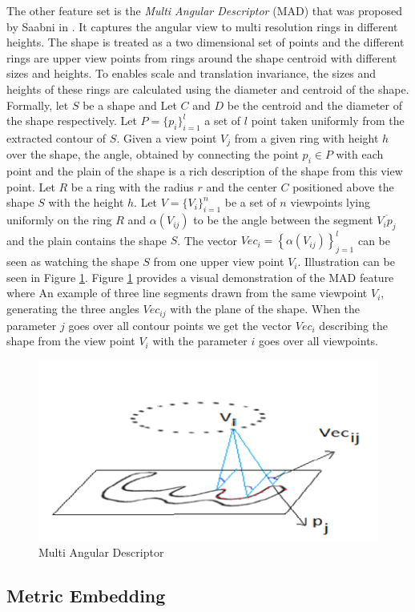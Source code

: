 \documentclass[10pt, conference, compsocconf]{IEEEtran}
\theoremstyle{definition}
\begin{document}
The other feature set is the \emph{Multi Angular Descriptor} (MAD) that was proposed by Saabni in \cite{saabni2013multi}. 
It captures the angular view to multi resolution rings in different heights. 
The shape is treated as a two dimensional set of points and the different rings are upper view points from rings around the shape centroid with different sizes and heights. 
To enables scale and translation invariance, the sizes and heights of these rings are calculated using the diameter and centroid of the shape.
Formally, let $S$ be a shape and Let $C$ and $D$ be the centroid and the diameter of the shape respectively. 
Let $P = \{p_i\}_{i = 1}^l$ a set of $l$ point taken uniformly from the extracted contour of $S$. Given a view point $V_j$ from a given ring with height $h$ over the shape, the angle, obtained by connecting the point ${p_i} \in P$ with each point and the plain of the shape is a rich description of the shape from this view point. Let $R$ be a ring with the radius $r$ and the center $C$ positioned above the shape $S$ with the height $h$. Let $V = \{V_i\}_{i = 1}^n$ be a set of $n$ viewpoints lying uniformly on the ring $R$ and $\alpha(V_{ij})$ to be the angle between the segment $\overline {{V_i}{p_j}}$ and the plain contains the shape $S$. The vector $Ve{c_i} = \left\{ {\alpha \left( {{V_{ij}}} \right)} \right\}_{j = 1}^l$ can be seen as watching the shape $S$ from one upper view point $V_i$. Illustration can be seen in Figure \ref{fig:mad_demo}.
Figure \ref{fig:mad_demo} provides a visual demonstration of the MAD feature where An example of three line segments drawn from the same viewpoint $V_i$, generating the three angles $Vec_{ij}$ with the plane of the shape. When the parameter $j$ goes over all contour points we get the vector $Vec_i$ describing the shape from the view point $V_i$ with the parameter $i$ goes over all viewpoints.

\begin{figure}
\centering
\includegraphics[width=0.5\columnwidth]{./figures/mad_demo}       
\caption{Multi Angular Descriptor}
\label{fig:mad_demo}
\end{figure}

\subsection{Metric Embedding}
\end{document}
